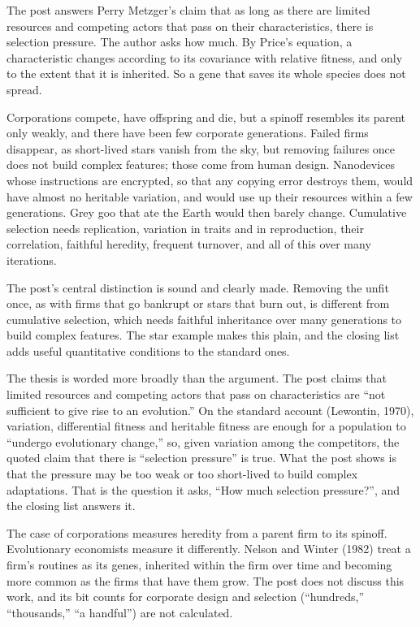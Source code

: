 \begin{afterword}
\summaryhead

The post answers Perry Metzger's claim that as long as there are limited resources and competing actors that pass on their characteristics, there is selection pressure. The author asks how much. By Price's equation, a characteristic changes according to its covariance with relative fitness, and only to the extent that it is inherited. So a gene that saves its whole species does not spread.

Corporations compete, have offspring and die, but a spinoff resembles its parent only weakly, and there have been few corporate generations. Failed firms disappear, as short-lived stars vanish from the sky, but removing failures once does not build complex features; those come from human design. Nanodevices whose instructions are encrypted, so that any copying error destroys them, would have almost no heritable variation, and would use up their resources within a few generations. Grey goo that ate the Earth would then barely change. Cumulative selection needs replication, variation in traits and in reproduction, their correlation, faithful heredity, frequent turnover, and all of this over many iterations.

\responsehead

The post's central distinction is sound and clearly made. Removing the unfit once, as with firms that go bankrupt or stars that burn out, is different from cumulative selection, which needs faithful inheritance over many generations to build complex features. The star example makes this plain, and the closing list adds useful quantitative conditions to the standard ones.

The thesis is worded more broadly than the argument. The post claims that limited resources and competing actors that pass on characteristics are ``not sufficient to give rise to an evolution.'' On the standard account (Lewontin, 1970), variation, differential fitness and heritable fitness are enough for a population to ``undergo evolutionary change,'' so, given variation among the competitors, the quoted claim that there is ``selection pressure'' is true. What the post shows is that the pressure may be too weak or too short-lived to build complex adaptations. That is the question it asks, ``How much selection pressure?'', and the closing list answers it.

The case of corporations measures heredity from a parent firm to its spinoff. Evolutionary economists measure it differently. Nelson and Winter (1982) treat a firm's routines as its genes, inherited within the firm over time and becoming more common as the firms that have them grow. The post does not discuss this work, and its bit counts for corporate design and selection (``hundreds,'' ``thousands,'' ``a handful'') are not calculated.


\end{afterword}
